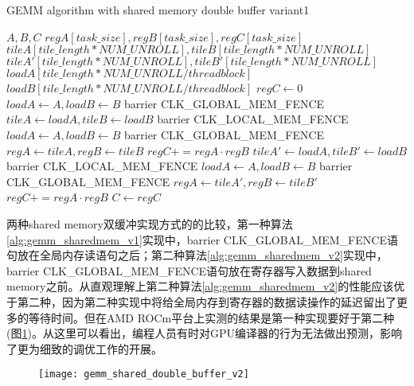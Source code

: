 \begin{algorithm}[htbp]
	\small
	\caption{GEMM algorithm with shared memory double buffer variant1}\label{alg:gemm_sharedmem_v1}
	\begin{algorithmic}[1]
		\State $A, B, C$
		\State $regA[task\_size],regB[task\_size],regC[task\_size]$
		\State $tileA[tile\_length*NUM\_UNROLL],tileB[tile\_length*NUM\_UNROLL]$
		\State $tileA'[tile\_length*NUM\_UNROLL],tileB'[tile\_length*NUM\_UNROLL]$
		\State $loadA[tile\_length*NUM\_UNROLL/threadblock]$
		\State $loadB[tile\_length*NUM\_UNROLL/threadblock]$
		\State $regC \gets 0$
		\State $loadA \gets A, loadB \gets B $
		\State barrier CLK\_GLOBAL\_MEM\_FENCE
				\State $tileA \gets loadA, tileB \gets loadB$
				\State barrier CLK\_LOCAL\_MEM\_FENCE
				\State $loadA \gets A, loadB \gets B $
				\State barrier CLK\_GLOBAL\_MEM\_FENCE
						\State $regA \gets tileA, regB \gets tileB$
						\State $regC += regA \cdot regB$
					\EndFor
			\Else  
				\State $tileA' \gets loadA, tileB' \gets loadB$
				\State barrier CLK\_LOCAL\_MEM\_FENCE
				\State $loadA \gets A, loadB \gets B $
				\State barrier CLK\_GLOBAL\_MEM\_FENCE
						\State $regA \gets tileA', regB \gets tileB'$
						\State $regC += regA \cdot regB$
					\EndFor
			\EndIf
		\EndFor\label{gemmendfor}
		\State $C \gets regC$
	\end{algorithmic}
\end{algorithm}
两种shared memory双缓冲实现方式的的比较，第一种算法\ref{alg:gemm_sharedmem_v1}实现中，barrier CLK\_GLOBAL\_MEM\_FENCE语句放在全局内存读语句之后；第二种算法\ref{alg:gemm_sharedmem_v2}实现中，barrier CLK\_GLOBAL\_MEM\_FENCE语句放在寄存器写入数据到shared memory之前。从直观理解上第二种算法\ref{alg:gemm_sharedmem_v2}的性能应该优于第二种，因为第二种实现中将给全局内存到寄存器的数据读操作的延迟留出了更多的等待时间。但在AMD ROCm平台上实测的结果是第一种实现要好于第二种(图\ref{fig:gemm_shared_double_buffer_v2})。从这里可以看出，编程人员有时对GPU编译器的行为无法做出预测，影响了更为细致的调优工作的开展。
\begin{figure}[htbp]
	\centering
	\texttt{[image: gemm\_shared\_double\_buffer\_v2]}
	\label{fig:gemm_shared_double_buffer_v2}
\end{figure}

